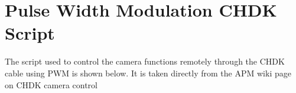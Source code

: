 \section{Pulse Width Modulation CHDK Script}
\label{app:pwm}

The script used to control the camera functions remotely through the CHDK cable
using PWM is shown below. It is taken directly from the APM wiki page on CHDK
camera
control
